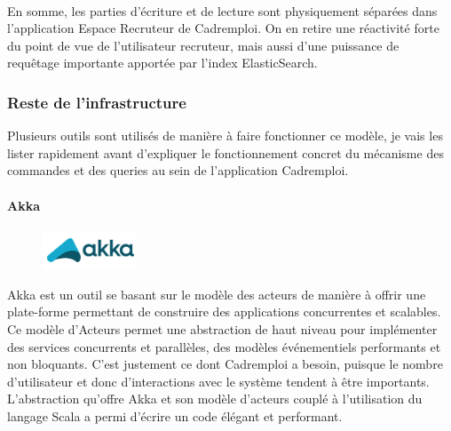 \paragraph{}
En somme, les parties d'écriture et de lecture sont physiquement séparées dans l'application Espace Recruteur de Cadremploi.
On en retire une réactivité forte du point de vue de l'utilisateur recruteur, mais aussi d'une puissance de requêtage importante apportée par l'index ElasticSearch.

\subsubsection{Reste de l'infrastructure}
\label{subs:Reste de l'infrastructure}
Plusieurs outils sont utilisés de manière à faire fonctionner ce modèle, je vais les lister rapidement avant d'expliquer le fonctionnement concret du mécanisme des commandes et des queries au sein de l'application Cadremploi.
\paragraph{Akka}
\label{par:Akka}
\begin{figure}
  \begin{center}
    \includegraphics[width=0.25\textwidth]{Pictures/akka_logo.png}
  \end{center}
\end{figure}
Akka est un outil se basant sur le modèle des acteurs de manière à offrir une plate-forme permettant de construire des applications concurrentes et scalables.
Ce modèle d'Acteurs permet une abstraction de haut niveau pour implémenter des services concurrents et parallèles, des modèles événementiels performants et non bloquants.
C'est justement ce dont Cadremploi a besoin, puisque le nombre d'utilisateur et donc d'interactions avec le système tendent à être importants.
L'abstraction qu'offre Akka et son modèle d'acteurs couplé à l'utilisation du langage Scala a permi d'écrire un code élégant et performant.
